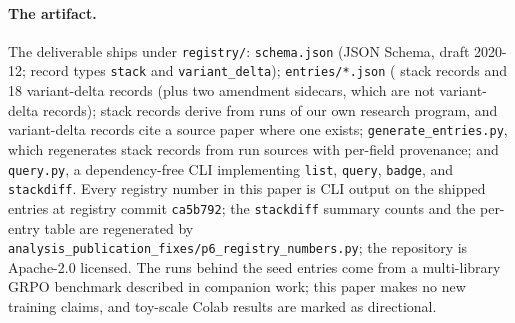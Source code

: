 \paragraph{The artifact.} The deliverable ships under \texttt{registry/}:
\texttt{schema.json} (JSON Schema, draft 2020-12; record types \texttt{stack}
and \texttt{variant\_delta}); \texttt{entries/*.json} (\NSTACK{} stack records
and 18 variant-delta records (plus two amendment sidecars, which are not
variant-delta records); stack records derive from runs of our own research
program, and variant-delta records cite a source paper where one exists;
\texttt{generate\_entries.py}, which
regenerates stack records from run sources with per-field provenance; and
\texttt{query.py}, a dependency-free CLI implementing \texttt{list},
\texttt{query}, \texttt{badge}, and \texttt{stackdiff}. Every registry number in
this paper is CLI output on the shipped entries at registry commit
\texttt{ca5b792}; the \texttt{stackdiff} summary counts and the per-entry table
are regenerated by
\texttt{analysis\_publication\_fixes/p6\_registry\_numbers.py}; the repository
is Apache-2.0 licensed. The runs behind the seed
entries come from a multi-library GRPO benchmark described in companion work;
this paper makes no new training claims, and toy-scale Colab results are
marked as directional.
